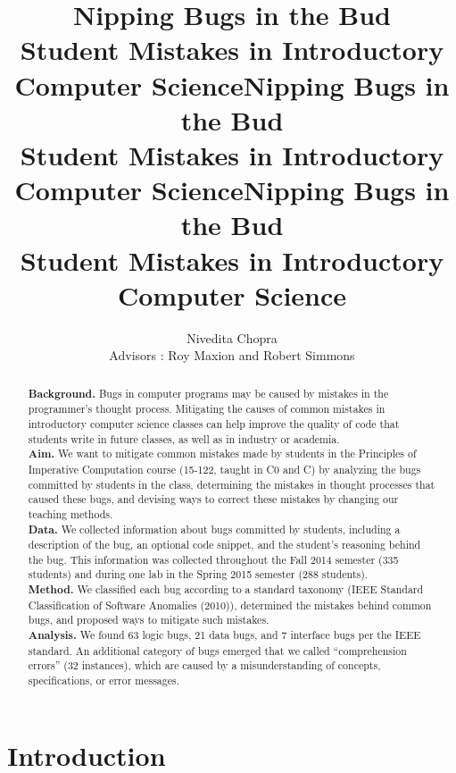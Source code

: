 \documentclass{sig-alternate}
\title{Nipping Bugs in the Bud\\ Student Mistakes in Introductory Computer Science}
\author{
\alignauthor
}
\title{\textbf{\Large{Nipping Bugs in the Bud\\ Student Mistakes in Introductory Computer Science}}}
\author{Nivedita Chopra\\ Advisors : Roy Maxion and Robert Simmons}
\date{}
\makeatletter
\newcommand{\acmtitle}[0]{
\title{Nipping Bugs in the Bud\\ Student Mistakes in Introductory Computer Science}
\numberofauthors{3}
\author{
\alignauthor
}
\maketitle
}
\newcommand{\thesistitle}[0]{
\title{\textbf{\Large{Nipping Bugs in the Bud\\ Student Mistakes in Introductory Computer Science}}}
\author{Nivedita Chopra\\ Advisors : Roy Maxion and Robert Simmons}
\date{}
\maketitle
\thispagestyle{empty}
\clearpage
}
\makeatother
\begin{document}
\acmtitle

\setcounter{page}{1}

\def\numlogicIEEE{66 }
\def\numdataIEEE{24 }
\def\numinterfaceIEEE{7 }
\def\numotherIEEE{26 }

\def\numlogic{63 }
\def\numdata{21 }
\def\numinterface{7 }
\def\numcomp{32 }
\def\numtotal{123 }
\def\numedge{31 }

\begin{abstract}
\textbf{Background.} Bugs in computer programs may be caused by mistakes in the programmer's thought process. Mitigating the causes of common mistakes in introductory computer science classes can help improve the quality of code that students write in future classes, as well as in industry or academia.\\

\textbf{Aim.} We want to mitigate common mistakes made by students in the Principles of Imperative Computation course (15-122, taught in C0 and C) by analyzing the bugs committed by students in the class, determining the mistakes in thought processes that caused these bugs, and devising ways to correct these mistakes by changing our teaching methods.\\

\textbf{Data.} We collected information about bugs committed by students, including a description of the bug, an optional code snippet, and the student's reasoning behind the bug. This information was collected throughout the Fall 2014 semester (335 students) and during one lab in the Spring 2015 semester (288 students).\\

\textbf{Method.} We classified each bug according to a standard taxonomy (IEEE Standard Classification of Software Anomalies (2010)), determined the mistakes behind common bugs, and proposed ways to mitigate such mistakes.\\

\textbf{Analysis.} We found \numlogic logic bugs, \numdata data bugs, and \numinterface interface bugs per the IEEE standard. An additional category of bugs emerged that we called ``comprehension errors'' (\numcomp instances), which are caused by a misunderstanding of concepts, specifications, or error messages. 

\end{abstract}

\section{Introduction}
\label{sec:intro}
\end{document}
